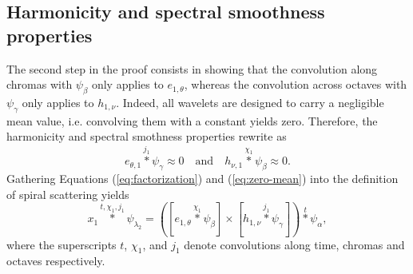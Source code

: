 \documentclass[twoside,a4paper]{article}
\begin{document}
\subsection{Harmonicity and spectral smoothness properties}
The second step in the proof consists in showing that the convolution along chromas with $\psi_\beta$ only applies to $e_{1,\theta}$, whereas the convolution across octaves with $\psi_\gamma$ only applies to $h_{1,\nu}$. Indeed, all wavelets are designed to carry a negligible mean value, i.e. convolving them with a constant yields zero. Therefore, the harmonicity and spectral smothness properties rewrite as
\begin{equation}
e_{\theta,1}\overset{j_{1}}{\ast}\psi_{\gamma}\approx0
\quad\mbox{and}\quad
h_{\nu,1}\overset{\chi_{1}}{\ast}\psi_{\beta}\approx0.
\label{eq:zero-mean}
\end{equation}
Gathering Equations (\ref{eq:factorization}) and (\ref{eq:zero-mean}) into the definition of spiral scattering yields
\begin{equation}
x_1 \overset{t,\chi_{1},j_{1}}{\ast} \psi_{\lambda_2} = \left(
\left[ e_{1,\theta} \overset{\chi_{1}}{\ast} \psi_{\beta} \right]
\times
\left[ h_{1,\nu} \overset{j_{1}}{\ast} \psi_{\gamma} \right]
\right)
\overset{t}{\ast} \psi_\alpha,
\end{equation}
where the superscripts $t$, $\chi_{1}$, and $j_{1}$ denote convolutions along time, chromas and octaves respectively.
\end{document}
